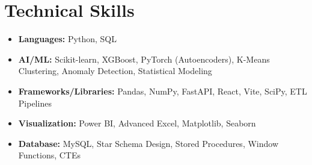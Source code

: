 \documentclass[10pt, letterpaper]{article}
\newenvironment{highlights}{
    \begin{itemize}[
        topsep=0.10 cm,
        parsep=0.10 cm,
        partopsep=0pt,
        itemsep=0pt,
        leftmargin=10pt
    ]
}{
    \end{itemize}
}
\begin{document}
\section{\textcolor{myblue}{\textbf{Technical Skills}}}

\begin{highlights}
\item \textbf{Languages:} Python, SQL
\item \textbf{AI/ML:} Scikit-learn, XGBoost, PyTorch (Autoencoders), K-Means Clustering, Anomaly Detection, Statistical Modeling
\item \textbf{Frameworks/Libraries:} Pandas, NumPy, FastAPI, React, Vite, SciPy, ETL Pipelines
\item \textbf{Visualization:} Power BI, Advanced Excel, Matplotlib, Seaborn
\item \textbf{Database:} MySQL, Star Schema Design, Stored Procedures, Window Functions, CTEs
\end{highlights}
\end{document}
